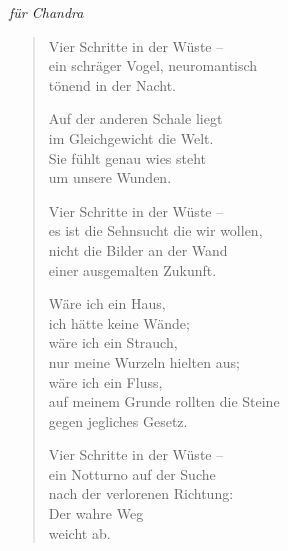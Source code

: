 

\hspace{2em}\emph{für Chandra}

\begin{verse}
Vier Schritte in der Wüste --\\
ein schräger Vogel, neuromantisch\\
tönend in der Nacht.

Auf der anderen Schale liegt\\
im Gleichgewicht die Welt.\\
Sie fühlt genau wies steht\\
um unsere Wunden.

Vier Schritte in der Wüste --\\
es ist die Sehnsucht die wir wollen,\\
nicht die Bilder an der Wand\\
einer ausgemalten Zukunft.

Wäre ich ein Haus,\\
ich hätte keine Wände;\\
wäre ich ein Strauch,\\
nur meine Wurzeln hielten aus;\\
wäre ich ein Fluss,\\
auf meinem Grunde rollten die Steine\\
gegen jegliches Gesetz.

Vier Schritte in der Wüste --\\
ein Notturno auf der Suche\\
nach der verlorenen Richtung:\\
Der wahre Weg\\
weicht ab.
\end{verse}

